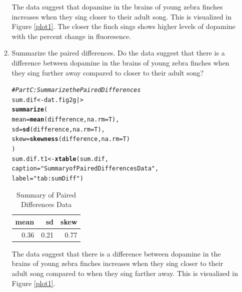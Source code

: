 \documentclass{article}\usepackage[]{graphicx}\usepackage[]{xcolor}
\makeatletter
\newcommand{\hlsng}[1]{\textcolor[rgb]{0.192,0.494,0.8}{#1}}%
\newcommand{\hlcom}[1]{\textcolor[rgb]{0.678,0.584,0.686}{\textit{#1}}}%
\newcommand{\hldef}[1]{\textcolor[rgb]{0.345,0.345,0.345}{#1}}%
\newcommand{\hlkwb}[1]{\textcolor[rgb]{0.69,0.353,0.396}{#1}}%
\newcommand{\hlkwc}[1]{\textcolor[rgb]{0.333,0.667,0.333}{#1}}%
\newcommand{\hlkwd}[1]{\textcolor[rgb]{0.737,0.353,0.396}{\textbf{#1}}}%
\newenvironment{kframe}{%
 \def\at@end@of@kframe{}%
 \ifinner\ifhmode%
  \def\at@end@of@kframe{\end{minipage}}%
  \begin{minipage}{\columnwidth}%
 \fi\fi%
 \def\FrameCommand##1{\hskip\@totalleftmargin \hskip-\fboxsep
 \colorbox{shadecolor}{##1}\hskip-\fboxsep
     \hskip-\linewidth \hskip-\@totalleftmargin \hskip\columnwidth}%
 \MakeFramed {\advance\hsize-\width
   \@totalleftmargin\z@ \linewidth\hsize
   \@setminipage}}%
 {\par\unskip\endMakeFramed%
 \at@end@of@kframe}
\newenvironment{knitrout}{}{} %
\makeatother
\begin{document}
\begin{enumerate}
\begin{enumerate}
The data suggest that dopamine in the brains of young zebra finches increases when they sing closer to their adult song. This is visualized in Figure \ref{plot1}. The closer the finch sings shows higher levels of dopamine with the percent change in fluoresence.
  \item Summarize the paired differences. Do the data suggest
  that there is a difference between dopamine in the brains of
  young zebra finches when they sing further away compared to 
  closer to their adult song?
\begin{knitrout}
\color{fgcolor}\begin{kframe}
\begin{alltt}
\hlcom{# Part C: Summarize the Paired Differences}
\hldef{sum.dif} \hlkwb{<-} \hldef{dat.fig2g |>}
  \hlkwd{summarize}\hldef{(}
    \hlkwc{mean} \hldef{=} \hlkwd{mean}\hldef{(difference,} \hlkwc{na.rm} \hldef{= T),}
    \hlkwc{sd} \hldef{=} \hlkwd{sd}\hldef{(difference,} \hlkwc{na.rm} \hldef{= T),}
    \hlkwc{skew} \hldef{=} \hlkwd{skewness}\hldef{(difference,} \hlkwc{na.rm}\hldef{=T)}
  \hldef{)}
\hldef{sum.dif.t1} \hlkwb{<-} \hlkwd{xtable}\hldef{(sum.dif,}
                         \hlkwc{caption} \hldef{=} \hlsng{"Summary of Paired Differences Data"}\hldef{,}
                         \hlkwc{label} \hldef{=} \hlsng{"tab:sumDiff"}\hldef{)}
\end{alltt}
\end{kframe}
\end{knitrout}
\begin{table}[H]
\centering
\begingroup\small
\begin{tabular}{rrr}
  \hline
mean & sd & skew \\ 
  \hline
0.36 & 0.21 & 0.77 \\ 
   \hline
\end{tabular}
\endgroup
\caption{Summary of Paired Differences Data} 
\label{tab:sumDiff}
\end{table}

The data suggest that there is a difference between dopamine in the brains of young zebra finches increases when they sing closer to their adult song compared to when they sing farther away. This is visualized in Figure \ref{plot1}.

\begin{figure}[H]
\begin{center}
\begin{knitrout}
\color{fgcolor}


\end{knitrout}
\end{center}
\end{figure}
\end{enumerate}
\end{enumerate}
\end{document}
